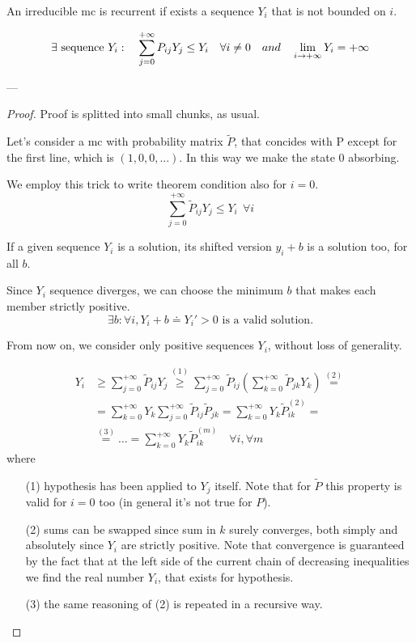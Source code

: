 	\begin{theorem}
		An irreducible \gls{mc} is recurrent if exists a sequence $Y_i$ that is not bounded on $i$.

		\begin{equation}\noindent
			\exists \text{ sequence } Y_i : \quad
 			\sum_{j=0}^{+\infty} P_{ij} Y_j \le Y_i \quad \forall i \neq 0 \quad and \quad
 			\lim_{i \to +\infty} Y_i = +\infty
		\end{equation}
	\end{theorem}
	---
	\begin{proof}
		Proof is splitted into small chunks, as usual.

		\proofpart
			Let's consider a \gls{mc} with probability matrix $\tilde{P}$, that concides with P except for the first line, which is $(1, 0, 0, ...)$.
			In this way we make the state 0 absorbing.

			We employ this trick to write theorem condition also for $i=0$.
			$$ \sum_{j=0}^{+\infty} \tilde{P}_{ij} Y_j \le Y_i ~~ \forall i$$

		\proofpart
			If a given sequence $Y_i$ is a solution, its shifted version $y_i + b$ is a solution too, for all $b$.

			Since $Y_i$ sequence diverges, we can choose the minimum $b$ that makes each member strictly positive.
			\begin{equation}
				\exists b: \forall i, Y_i + b \doteq Y_i' > 0 \text{ is a valid solution.}
			\end{equation}

			From now on, we consider only positive sequences $Y_i$, without loss of generality.

		\proofpart
			\begin{equation}\begin{split}
				Y_i & \ge \sum_{j=0}^{+\infty} \tilde{P}_{ij} Y_j \stackrel{(1)}{\ge}
				\sum_{j=0}^{+\infty} \tilde{P}_{ij} \left( \sum_{k=0}^{+\infty} \tilde{P}_{jk} Y_k \right) \stackrel{(2)}{=} \\
				& = \sum_{k=0}^{+\infty} Y_k \sum_{j=0}^{+\infty} \tilde{P}_{ij}  \tilde{P}_{jk} =
				\sum_{k=0}^{+\infty} Y_k \tilde{P}_{ik}^{(2)} = \\
				& \stackrel{(3)}{=} \ldots = \sum_{k=0}^{+\infty} Y_k \tilde{P}_{ik}^{(m)} \quad\forall i,\forall m
			\end{split}\end{equation}
			where
			\begin{itemize}
				\item[(1)] hypothesis has been applied to $Y_j$ itself. Note that for $\tilde{P}$ this property is valid for $i=0$ too (in general it's not true for $P$).
				\item[(2)] sums can be swapped since sum in $k$ surely converges, both simply and absolutely since $Y_i$ are strictly positive. Note that convergence is guaranteed by the fact that at the left side of the current chain of decreasing inequalities we find the real number $Y_i$, that exists for hypothesis.
				\item[(3)] the same reasoning of (2) is repeated in a recursive way.
			\end{itemize}


\end{proof}
